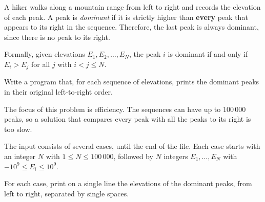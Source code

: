 
\Statement

A hiker walks along a mountain range from left to right and records the elevation of each peak. A peak is \emph{dominant} if it is strictly higher than \textbf{every} peak that appears to its right in the sequence. Therefore, the last peak is always dominant, since there is no peak to its right.

\medskip

Formally, given elevations $E_1, E_2, \ldots, E_N$, the peak $i$ is dominant if and only if $E_i > E_j$ for all $j$ with $i < j \leq N$.

\medskip

Write a program that, for each sequence of elevations, prints the dominant peaks in their original left-to-right order.

\Observation

The focus of this problem is efficiency. The sequences can have up to $100\,000$ peaks, so a solution that compares every peak with all the peaks to its right is too slow.

\Input

The input consists of several cases, until the end of the file. Each case starts with an integer $N$ with $1 \leq N \leq 100\,000$, followed by $N$ integers $E_1, \ldots, E_N$ with $-10^9 \leq E_i \leq 10^9$.

\Output

For each case, print on a single line the elevations of the dominant peaks, from left to right, separated by single spaces.

\SampleTwoCol
